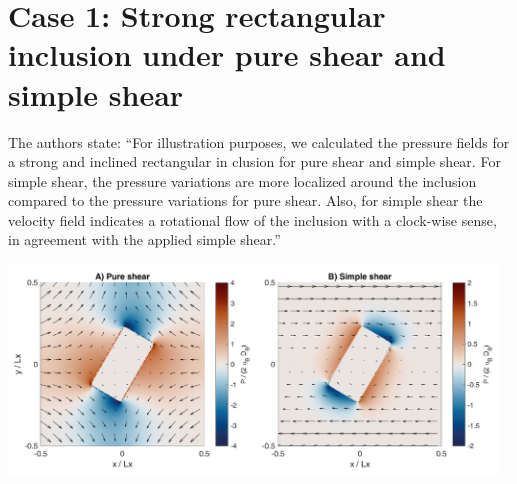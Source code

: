 \newpage
\section*{Case 1: Strong rectangular inclusion under pure shear and simple shear}

The authors state:
``For illustration purposes, we calculated the pressure fields for a strong and inclined rectangular in­
clusion for pure shear and simple shear. For simple shear, the
pressure variations are more localized around the inclusion compared to
the pressure variations for pure shear. Also, for simple shear the velocity
field indicates a rotational flow of the inclusion with a clock-wise sense,
in agreement with the applied simple shear.''

\begin{center}
\includegraphics[width=13cm]{python_codes/fieldstone_142/images/hams22_c}\\
\end{center}

